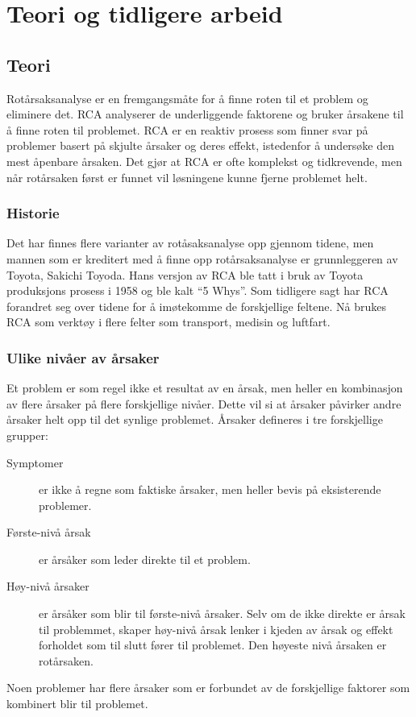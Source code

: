 \chapter{Teori og tidligere arbeid}
\label{kap:teori}

\section{Teori}
Rotårsaksanalyse er en fremgangsmåte for å finne roten til et problem og eliminere det. RCA analyserer de underliggende faktorene og bruker årsakene til å finne roten til problemet. RCA er en reaktiv prosess som finner svar på problemer basert på skjulte årsaker og deres effekt, istedenfor å undersøke den mest åpenbare årsaken. Det gjør at RCA er ofte komplekst og tidkrevende, men når rotårsaken først er funnet vil løsningene kunne fjerne problemet helt. 

\subsection{Historie}
Det har finnes flere varianter av rotåsaksanalyse opp gjennom tidene, men mannen som er kreditert med å finne opp rotårsaksanalyse er grunnleggeren av Toyota, Sakichi Toyoda. Hans versjon av RCA ble tatt i bruk av Toyota produksjons prosess i 1958 og ble kalt ``5 Whys''. Som tidligere sagt har RCA forandret seg over tidene for å imøtekomme de forskjellige feltene. Nå brukes RCA som verktøy i flere felter som transport, medisin og luftfart. 
    
\subsection{Ulike nivåer av årsaker}
Et problem er som regel ikke et resultat av en årsak, men heller en kombinasjon av flere årsaker på flere forskjellige nivåer. Dette vil si at årsaker påvirker andre årsaker helt opp til det synlige problemet. Årsaker defineres i tre forskjellige grupper: 

\begin{description}
    \item[Symptomer] er ikke å regne som faktiske årsaker, men heller bevis på eksisterende problemer.
    \item[Første-nivå årsak] er årsåker som leder direkte til et problem.
    \item[Høy-nivå årsaker] er årsåker som blir til første-nivå årsaker. Selv om de ikke direkte er årsak til problemmet, skaper høy-nivå årsak lenker i kjeden av årsak og effekt forholdet som til slutt fører til problemet.  Den høyeste nivå årsaken er rotårsaken.  
\end{description}
Noen problemer har flere årsaker som er forbundet av de forskjellige faktorer som kombinert blir til problemet.

